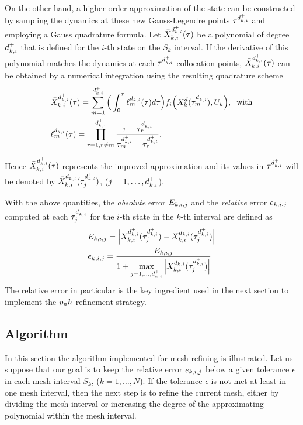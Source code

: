 On the other hand, a higher-order approximation of the state can be constructed by sampling the dynamics at these new Gauss-Legendre points $\tau^{{d}_{k,i}^{+}}$ and employing a Gauss quadrature formula.
Let $\bar{X}_{k,i}^{d_{k,i}^{+}} (\tau)$ be a polynomial of degree $d_{k,i}^{+}$ that is defined for the $i$-th state on the $S_k$ interval. If the derivative of this polynomial matches the dynamics at each $\tau^{{d}_{k,i}^{+}}$ collocation points, $\bar{X}_{k,i}^{d_{k,i}^{+}} (\tau)$ can be obtained by a numerical integration using the resulting quadrature scheme
\begin{subequations}
\begin{align}
	&\bar{X}_{k,i}^{d_{k,i}^{+}} (\tau) = \sum_{m=1}^{d_{k,i}^{+}}\Big(\int_{0}^{\tau}\ell_{m}^{d_{k,i}} (\tau)d\tau\Big) f_i\Big(X_{k}^{d}(\tau^{{d}_{k,i}^{+}}_m), U_k\Big), \hspace{2mm} \text{with} \label{eq:barX}\\
	&  \ell_{m}^{d_{k,i}} (\tau) = \prod_{r=1, r\neq m}^{d_{k,i}^{+}} \dfrac{\tau - \tau^{{d}_{k,i}^{+}}_r}{\tau^{{d}_{k,i}^{+}}_m - \tau^{{d}_{k,i}^{+}}_r}. \label{eq:meshlm}
\end{align}
\end{subequations}

Hence $\bar{X}_{k,i}^{d_{k,i}^{+}} (\tau)$ represents the improved approximation and its values in $\tau^{{d}_{k,i}^{+}}$ will be denoted by $\bar{X}_{k,i}^{d_{k,i}^{+}} (\tau^{{d}_{k,i}^{+}}_j)$, ($j = 1, \dots, d_{k,i}^{+}$).

With the above quantities, the \emph{absolute} error $E_{k,i,j}$ and the \emph{relative} error $e_{k,i,j}$ computed at each $\tau^{{d}_{k,i}^{+}}_j$ for the $i$-th state in the $k$-th interval are defined as
\begin{subequations}
	\begin{align}
	&E_{k,i,j} = \Big|\bar{X}_{k,i}^{d_{k,i}^{+}} (\tau^{{d}_{k,i}^{+}}_j) - X_{k,i}^{d_{k,i}} (\tau^{{d}_{k,i}^{+}}_j)\Big| \label{eq:absolute}\\
	&e_{k,i,j} = \dfrac{E_{k,i,j}}{1 + \max\limits_{j= 1, \dots, d_{k,i}^{+}} \Big| X_{k,i}^{d_{k,i}} (\tau^{{d}_{k,i}^{+}}_j)\Big|} \label{eq:relative}
	\end{align}
\end{subequations}
The relative error in particular is the key ingredient used  in the next section to implement the $p_{n}h$-refinement strategy.

\subsection*{Algorithm}
In this section the algorithm implemented for mesh refining is illustrated.
Let us suppose that our goal is to keep the relative error $e_{k,i,j}$ below a given tolerance $\epsilon$ in each mesh interval $S_k$, ($k = 1, \dots, N$). If the tolerance $\epsilon$  is not met at least in one mesh interval, then the next step is to refine the current mesh, either by dividing the mesh interval or increasing the degree of the approximating polynomial within the mesh interval.


